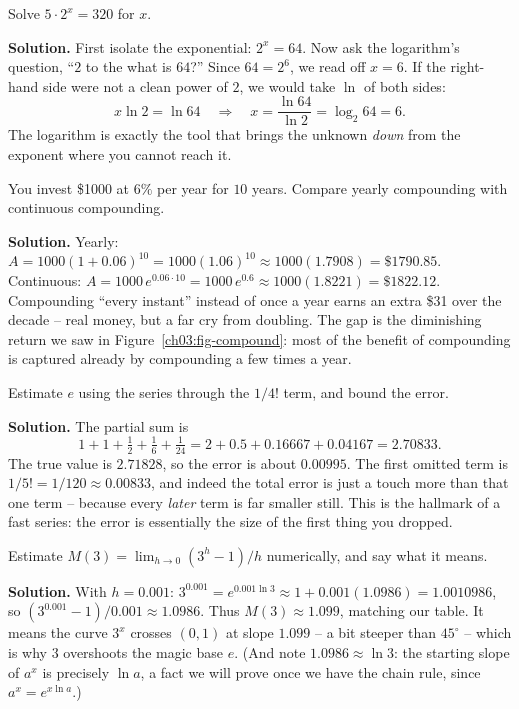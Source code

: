 \begin{example}\label{ch03:ex-solve}
Solve $5\cdot 2^{x} = 320$ for $x$.

\textbf{Solution.} First isolate the exponential: $2^x = 64$. Now ask the logarithm's question, ``$2$ to the what is $64$?'' Since $64=2^6$, we read off $x=6$. If the right-hand side were not a clean power of $2$, we would take $\ln$ of both sides:
\[
x\ln 2 = \ln 64 \quad\Longrightarrow\quad x = \frac{\ln 64}{\ln 2} = \log_2 64 = 6 .
\]
The logarithm is exactly the tool that brings the unknown \emph{down} from the exponent where you cannot reach it.
\end{example}

\begin{example}\label{ch03:ex-money}
You invest \$1000 at $6\%$ per year for $10$ years. Compare yearly compounding with continuous compounding.

\textbf{Solution.} Yearly: $A = 1000(1+0.06)^{10} = 1000(1.06)^{10}\approx 1000(1.7908)=\$1790.85$. Continuous: $A = 1000\,e^{0.06\cdot 10} = 1000\,e^{0.6}\approx 1000(1.8221)=\$1822.12$. Compounding ``every instant'' instead of once a year earns an extra \$31 over the decade -- real money, but a far cry from doubling. The gap is the diminishing return we saw in Figure~\ref{ch03:fig-compound}: most of the benefit of compounding is captured already by compounding a few times a year.
\end{example}

\begin{example}\label{ch03:ex-series}
Estimate $e$ using the series through the $1/4!$ term, and bound the error.

\textbf{Solution.} The partial sum is
\[
1 + 1 + \tfrac12 + \tfrac16 + \tfrac{1}{24} = 2 + 0.5 + 0.16667 + 0.04167 = 2.70833.
\]
The true value is $2.71828$, so the error is about $0.00995$. The first omitted term is $1/5! = 1/120 \approx 0.00833$, and indeed the total error is just a touch more than that one term -- because every \emph{later} term is far smaller still. This is the hallmark of a fast series: the error is essentially the size of the first thing you dropped.
\end{example}

\begin{example}\label{ch03:ex-slope}
Estimate $M(3)=\lim_{h\to0}(3^h-1)/h$ numerically, and say what it means.

\textbf{Solution.} With $h=0.001$: $3^{0.001}=e^{0.001\ln 3}\approx 1+0.001(1.0986)=1.0010986$, so $(3^{0.001}-1)/0.001 \approx 1.0986$. Thus $M(3)\approx 1.099$, matching our table. It means the curve $3^x$ crosses $(0,1)$ at slope $1.099$ -- a bit steeper than $45^\circ$ -- which is why $3$ overshoots the magic base $e$. (And note $1.0986\approx \ln 3$: the starting slope of $a^x$ is precisely $\ln a$, a fact we will prove once we have the chain rule, since $a^x = e^{x\ln a}$.)
\end{example}

